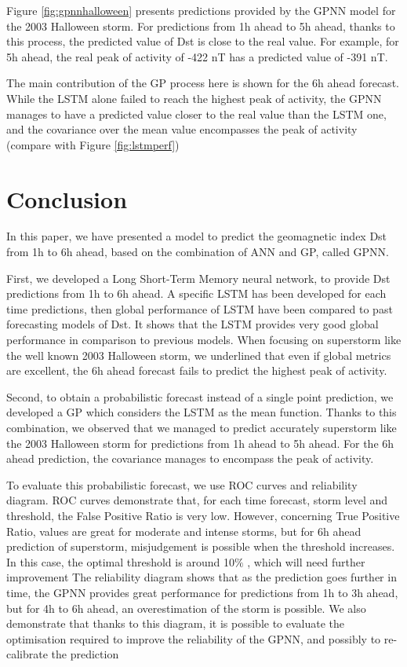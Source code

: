 Figure \ref{fig:gpnnhalloween} presents predictions provided by the GPNN model for the 2003 Halloween storm. 
For predictions from 1h ahead to 5h ahead, thanks to this process, the predicted value of Dst is close to the 
real value. For example, for 5h ahead, the real peak of activity of -422 nT has a predicted value of -391 nT. 

The main contribution of the GP process here is shown for the 6h ahead forecast. While the LSTM alone failed to 
reach the highest peak of activity, the GPNN manages to have a predicted value closer to the real value than 
the LSTM one, and the covariance over the mean value encompasses the peak of activity 
(compare with Figure \ref{fig:lstmperf})



\section{Conclusion}


In this paper, we have presented a model to predict the geomagnetic index Dst from 1h to 6h ahead, 
based on the combination of ANN and GP, called GPNN. 

First, we developed a Long Short-Term Memory neural network, to provide Dst predictions from 1h to 6h ahead. 
A specific LSTM has been developed for each time predictions, then global performance of LSTM have been compared 
to past forecasting models of Dst. It shows that the LSTM provides very good global performance in comparison 
to previous models. When focusing on superstorm like the well known 2003 Halloween storm, we underlined that 
even if global metrics are excellent, the 6h ahead forecast fails to predict the highest peak of activity. 


Second, to obtain a probabilistic forecast instead of a single point prediction, we developed a GP which 
considers the LSTM as the mean function. Thanks to this combination, we observed that we managed to predict 
accurately superstorm like the 2003 Halloween storm for predictions from 1h ahead to 5h ahead. For the 
6h ahead prediction, the covariance manages to encompass the peak of activity. 

To evaluate this probabilistic forecast, we use ROC curves and reliability diagram. ROC curves demonstrate that, 
for each time forecast, storm level and threshold, the False Positive Ratio is very low. However, concerning 
True Positive Ratio, values are great for moderate and intense storms, but for 6h ahead prediction of superstorm, 
misjudgement is possible when the threshold increases. In this case, the optimal threshold is around 10$\%$ , 
which will need further improvement The reliability diagram shows that as the prediction goes further in time, 
the GPNN provides great performance for predictions from 1h to 3h ahead, but for 4h to 6h ahead, 
an overestimation of the storm is possible. We also demonstrate that thanks to this diagram, it is possible to 
evaluate the optimisation required to improve the reliability of the GPNN, and possibly to 
re-calibrate the prediction


